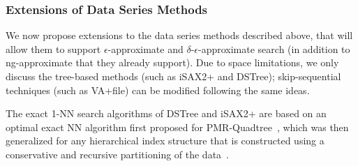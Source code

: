 \vspace*{-0.2cm}

\subsubsection{Extensions of Data Series Methods}
\label{sec:dataseriesextensions}

We now propose extensions to the data series methods described above, that will allow them to support $\epsilon$-approximate and $\delta$-$\epsilon$-approximate search (in addition to ng-approximate that they already support).
Due to space limitations, we only discuss the tree-based methods (such as iSAX2+ and DSTree); skip-sequential techniques (such as VA+file) can be modified following the same ideas.

The exact 1-NN search algorithms of DSTree and iSAX2+ are based on an optimal exact NN algorithm first proposed for PMR-Quadtree~\cite{conf/isasd/samet1995}, which was then generalized for any hierarchical index structure that is constructed using a conservative and recursive partitioning of the data~\cite{conf/pods/berchtold1997}. 

